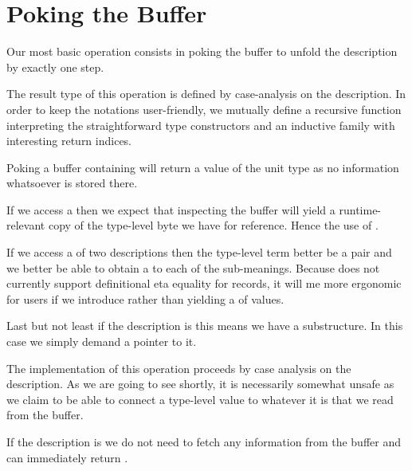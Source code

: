 
\section{Poking the Buffer}\label{sec:poking}

Our most basic operation consists in poking the buffer to unfold
the description by exactly one step.


The result type of this operation is defined by case-analysis on the
description. In order to keep the notations user-friendly, we
mutually define
a recursive function  interpreting the straightforward type constructors
and an inductive family  with interesting return indices.


Poking a buffer containing  will return a value of
the unit type as no information whatsoever is stored there.

If we access a  then we expect that inspecting the
buffer will yield a runtime-relevant copy of the type-level byte we
have for reference. Hence the use of .

If we access a  of two descriptions then the type-level term
better be a pair and we better be able to obtain a 
to each of the sub-meanings.
%
Because \idris{} does not currently support definitional eta equality
for records, it will me more ergonomic for users if we introduce
 rather than yielding a  of values.

Last but not least if the description is  this means
we have a substructure. In this case we simply demand a pointer to it.


The implementation of this operation proceeds by case analysis
on the description.
%
As we are going to see shortly, it is necessarily somewhat unsafe
as we claim to be able to connect a type-level value to whatever
it is that we read from the buffer.


If the description is  we do not need to fetch any
information from the buffer and can immediately return \IdrisData{()}.

